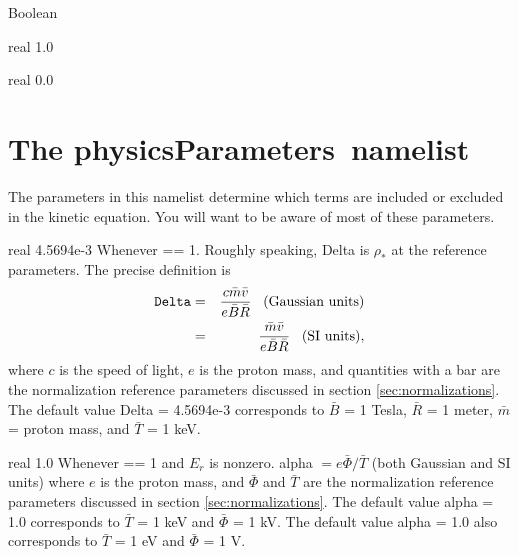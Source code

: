 \myhrule

{Boolean}
{\false}
{}
{}

\myhrule

{real}
{1.0}
{}
{}

\myhrule

{real}
{0.0}
{}
{}




\section{The {\ttfamily physicsParameters}~namelist}
\label{sec:physicsParameters}

The parameters in this namelist determine which terms are included or excluded in the kinetic equation.
You will want to be aware of most of these parameters.

\myhrule

{real}
{4.5694e-3}
{Whenever  == 1.}
{Roughly speaking, {\ttfamily Delta} is $\rho_*$ at the reference parameters. The precise definition is
\begin{eqnarray}
\mbox{\ttfamily Delta} 
&=& \frac{c \bar{m} \bar{v}}{e \bar{B} \bar{R}} \;\;\; \mbox{(Gaussian units)} \\
&=&  \frac{\bar{m} \bar{v}}{e \bar{B} \bar{R}} \;\;\; \mbox{(SI units)}, \nonumber
\end{eqnarray}
where $c$ is the speed of light,
$e$ is the proton mass,
and quantities with a bar are the normalization reference parameters discussed in section \ref{sec:normalizations}.
The default value {\ttfamily Delta} = 4.5694e-3 corresponds to $\bar{B}$ = 1 Tesla, $\bar{R}$ = 1 meter,
$\bar{m}$ = proton mass, and $\bar{T}$ = 1 keV.}

\myhrule

{real}
{1.0}
{Whenever  == 1 and $E_r$ is nonzero.}
{{\ttfamily alpha} $= e \bar{\Phi}/ \bar{T}$ (both Gaussian and SI units) where $e$ is the proton mass,
and $\bar{\Phi}$ and $\bar{T}$ are the normalization reference parameters discussed in section \ref{sec:normalizations}.
The default value {\ttfamily alpha} = 1.0 corresponds to $\bar{T}$ = 1 keV and $\bar{\Phi}$ = 1 kV.
The default value {\ttfamily alpha} = 1.0 also corresponds to $\bar{T}$ = 1 eV and $\bar{\Phi}$ = 1 V.
}

